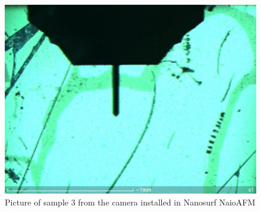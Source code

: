 \documentclass[11pt,a4paper]{article}
\begin{document}
\begin{figure}[ht]
\centering
\includegraphics[scale=0.4]{sm_sample3_set}
\caption{Picture of sample 3 from the camera installed in Nanosurf NaioAFM}
\label{fig:sample3_light_green_cam}
\end{figure}
\end{document}
